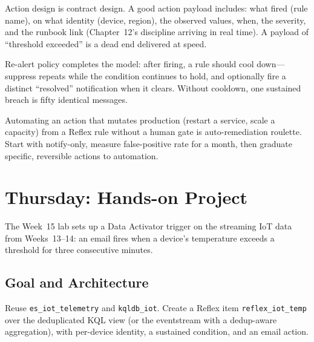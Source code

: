 Action design is contract design. A good action payload includes: what fired (rule name), on what identity (device, region), the observed values, when, the severity, and the runbook link (Chapter~12's discipline arriving in real time). A payload of ``threshold exceeded'' is a dead end delivered at speed.

Re-alert policy completes the model: after firing, a rule should cool down---suppress repeats while the condition continues to hold, and optionally fire a distinct ``resolved'' notification when it clears. Without cooldown, one sustained breach is fifty identical messages.

\begin{pitfall}
Automating an action that mutates production (restart a service, scale a capacity) from a Reflex rule without a human gate is auto-remediation roulette. Start with notify-only, measure false-positive rate for a month, then graduate specific, reversible actions to automation.
\end{pitfall}

\section{Thursday: Hands-on Project}
The Week~15 lab sets up a Data Activator trigger on the streaming IoT data from Weeks~13--14: an email fires when a device's temperature exceeds a threshold for three consecutive minutes.

\subsection{Goal and Architecture}
Reuse \texttt{es\_iot\_telemetry} and \texttt{kqldb\_iot}. Create a Reflex item \texttt{reflex\_iot\_temp} over the deduplicated KQL view (or the eventstream with a dedup-aware aggregation), with per-device identity, a sustained condition, and an email action.


